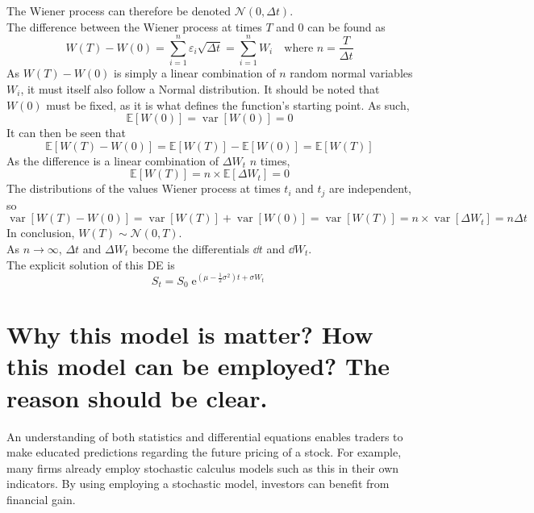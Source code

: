 \documentclass[12pt, A4]{article}
\DeclareMathOperator{\en}{e}
\newcommand{\Exp}{\mathbb{E}}
\newcommand{\ndist}{\mathcal{N}}
\DeclareMathOperator{\vari}{var}
\begin{document}
				The Wiener process can therefore be denoted \(\ndist(0, \Delta t)\). \\
			The difference between the Wiener process at times \(T\) and 0 can be found as
				\[W(T) - W(0) = \sum_{i = 1}^n \varepsilon_i\sqrt{\Delta t} = \sum_{i = 1}^n W_i \quad \text{where } n = \frac{T}{\Delta t} \]
				As \(W(T) - W(0)\) is simply a linear combination of \(n\) random normal variables \(W_i\), it must itself also follow a Normal distribution. It should be noted that \(W(0)\) must be fixed, as it is what defines the function's starting point. As such,
				\[\Exp[W(0)] = \vari[W(0)] = 0\]
		 		It can then be seen that
		 		\[\Exp[W(T) - W(0)] = \Exp[W(T)] - \Exp[W(0)] = \Exp[W(T)]\]
		 		As the difference is a linear combination of \(\Delta W_t\) \(n\) times,
		 			\[\Exp[W(T)] = n \times \Exp[\Delta W_t] = 0\]
		 		The distributions of the values Wiener process at times \(t_i\) and \(t_j\) are independent, so
		 			\[\vari[W(T) - W(0)] = \vari[W(T)] + \vari[W(0)] = \vari[W(T)] = n \times \vari[\Delta W_t] = n\Delta t\]
		 		In conclusion, \(W(T) \sim \ndist(0, T)\). \\
			 As \(n \to \infty\), \(\Delta t\) and \(\Delta W_t\) become the differentials \(\dd{t}\) and \(\dd{W_t}\). \\
			 The explicit solution of this DE is
			 	\[S_t = S_0\en^{\left(\mu - \frac{1}{2}\sigma^2\right)t + \sigma W_t}\]
		\section{Why this model is matter? How this model can be employed? The reason should be clear.}
			An understanding of both statistics and differential equations enables traders to make educated predictions regarding the future pricing of a stock. For example, many firms already employ stochastic calculus models such as this in their own indicators. By using employing a stochastic model, investors can benefit from financial gain. 
\end{document}
